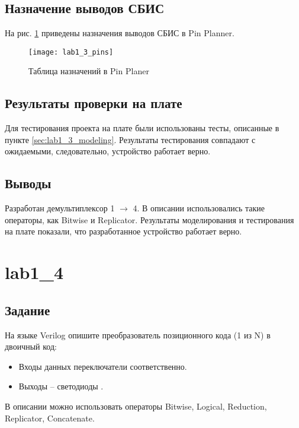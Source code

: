 \subsection{Назначение выводов СБИС}

На рис. \ref{fig:lab1_3_pins} приведены назначения выводов СБИС в Pin Planner.

\begin{figure}[H]
\begin{center}
	\texttt{[image: lab1\_3\_pins]}
	\caption{Таблица назначений в Pin Planer}
	\label{fig:lab1_3_pins}
\end{center}
\end{figure}

\subsection{Результаты проверки на плате}

Для тестирования проекта на плате были использованы тесты, описанные в пункте \ref{sec:lab1_3_modeling}. Результаты тестирования совпадают с ожидаемыми, следовательно, устройство работает верно.

\subsection{Выводы}

Разработан демультиплексор 1 $\rightarrow$ 4. В описании использовались такие операторы, как Bitwise и Replicator. Результаты моделирования и тестирования на плате показали, что разработанное устройство работает верно.

\newpage

\section{lab1\_4}

\subsection{Задание}

На языке Verilog опишите преобразователь позиционного кода (1 из N) в двоичный код:
\begin{itemize}
	\item Входы данных переключатели  соответственно.
	\item Выходы – светодиоды .
\end{itemize}
В описании можно использовать операторы Bitwise, Logical, Reduction, Replicator, Concatenate.

